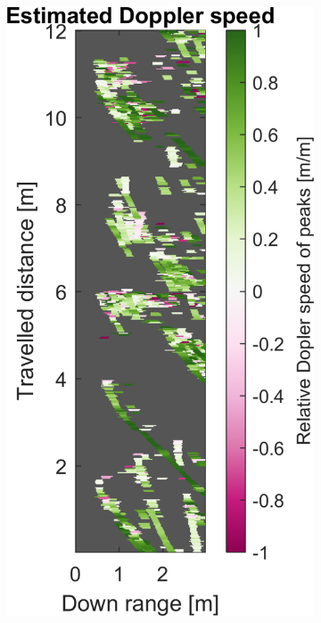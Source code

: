 \begin{figure}[htbp]
\begin{subfigure}[t]{0.475\linewidth}
    \end{subfigure}%
    \hfill%
    \begin{subfigure}[t]{0.475\linewidth}  
        \centering 
        \includegraphics[width=\linewidth,max height=.475\textheight]{gfx/results/indoorswimmingpool_doppler.png}

\end{subfigure}
\end{figure}
